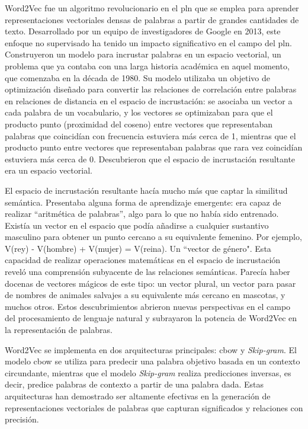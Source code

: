 Word2Vec fue un algoritmo revolucionario en el \acrfull{pln} que se emplea para aprender representaciones vectoriales densas de palabras a partir de grandes cantidades de texto. Desarrollado por un equipo de investigadores de Google en 2013\cite{Mikolov2013Word2Vec}, este enfoque no supervisado ha tenido un impacto significativo en el campo del \acrshort{pln}. Construyeron un modelo para incrustar palabras en un espacio vectorial, un problema que ya contaba con una larga historia académica en aquel momento, que comenzaba en la década de 1980. Su modelo utilizaba un objetivo de optimización diseñado para convertir las relaciones de correlación entre palabras en relaciones de distancia en el espacio de incrustación: se asociaba un vector a cada palabra de un vocabulario, y los vectores se optimizaban para que el producto punto (proximidad del coseno) entre vectores que representaban palabras que coincidían con frecuencia estuviera más cerca de 1, mientras que el producto punto entre vectores que representaban palabras que rara vez coincidían estuviera más cerca de 0. Descubrieron que el espacio de incrustación resultante era un espacio vectorial. 

El espacio de incrustación resultante hacía mucho más que captar la similitud semántica. Presentaba alguna forma de aprendizaje emergente: era capaz de realizar ``aritmética de palabras'', algo para lo que no había sido entrenado. Existía un vector en el espacio que podía añadirse a cualquier sustantivo masculino para obtener un punto cercano a su equivalente femenino. Por ejemplo, V(rey) - V(hombre) + V(mujer) = V(reina). Un ``vector de género". Esta capacidad de realizar operaciones matemáticas en el espacio de incrustación reveló una comprensión subyacente de las relaciones semánticas. Parecía haber docenas de vectores mágicos de este tipo: un vector plural, un vector para pasar de nombres de animales salvajes a su equivalente más cercano en mascotas, y muchos otros. Estos descubrimientos abrieron nuevas perspectivas en el campo del procesamiento de lenguaje natural y subrayaron la potencia de Word2Vec en la representación de palabras\cite{Chollet}.


Word2Vec se implementa en dos arquitecturas principales: \acrfull{cbow} y \textit{Skip-gram}. El modelo \acrshort{cbow} se utiliza para predecir una palabra objetivo basada en un contexto circundante, mientras que el modelo \textit{Skip-gram} realiza predicciones inversas, es decir, predice palabras de contexto a partir de una palabra dada. Estas arquitecturas han demostrado ser altamente efectivas en la generación de representaciones vectoriales de palabras que capturan significados y relaciones con precisión.

